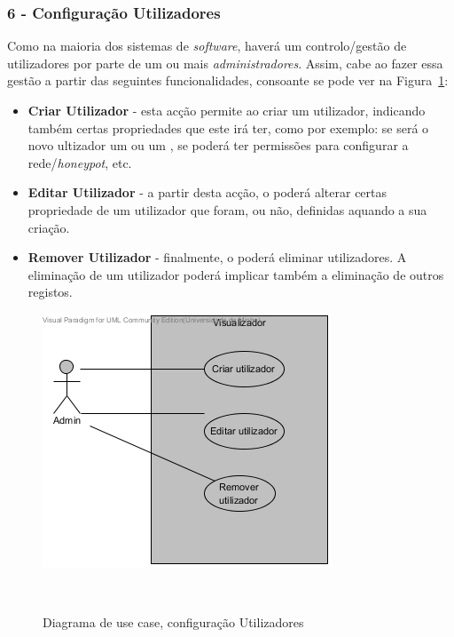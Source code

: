 \subsubsection{\textbf{6 - Configuração Utilizadores}}
Como na maioria dos sistemas de \emph{software}, haverá um controlo/gestão de utilizadores por parte de um ou mais \emph{administradores}. Assim, cabe ao \admini fazer essa gestão a partir das seguintes funcionalidades, consoante se pode ver na Figura~\ref{fig: confutil}:

\begin{itemize}
 \item \textbf{Criar Utilizador} - esta acção permite ao \admini criar um utilizador, indicando também certas propriedades que este irá ter, como por exemplo: se será o novo ultizador um \admini ou um \uticomum, se poderá ter permissões para configurar a rede/\emph{honeypot}, etc.
 \item \textbf{Editar Utilizador} - a partir desta acção, o \admini poderá alterar certas propriedade de um utilizador que foram, ou não, definidas aquando a sua criação.
 \item \textbf{Remover Utilizador} - finalmente, o \admini poderá eliminar utilizadores. A eliminação de um utilizador poderá implicar também a eliminação de outros registos.
\end{itemize}

\begin{figure}[!ht]
\centering
\includegraphics[scale=0.80]{images/ucs/ConfUtilizadores}
\caption {Diagrama de use case, configuração Utilizadores}~\label{fig: confutil}
\end{figure}
\pagebreak


